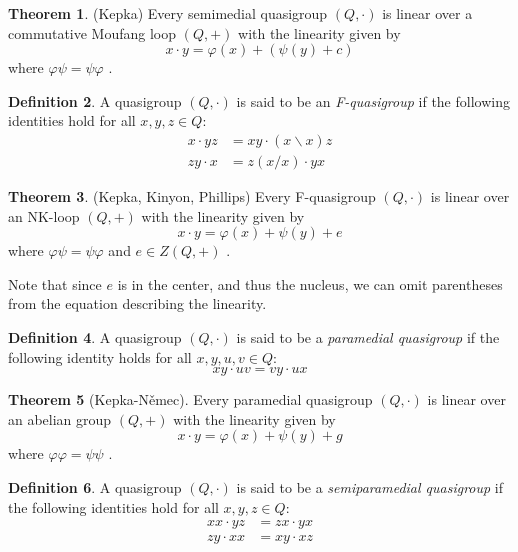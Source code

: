 \documentclass[12pt]{report}
\theoremstyle{definition}
\newtheorem{thm}{Theorem}[chapter]
\newtheorem{dfn}[thm]{Definition}
\newcommand{\ldv}{\backslash}       %
\newcommand{\rdv}{/}                %
\begin{document}
\begin{thm}(Kepka)
  Every semimedial quasigroup $(Q, \cdot)$ is linear over a commutative Moufang loop $(Q, +)$ with
    the linearity given by
  \[x\cdot y = \varphi(x) + (\psi(y) + c)\]
  where $\varphi\psi = \psi\varphi$ \cite{triabelian}.
\end{thm}

\begin{dfn}
  A quasigroup $(Q, \cdot)$ is said to be an \emph{F-quasigroup} if the following identities hold
    for all $x, y, z \in Q$:
  \begin{align*}
    x\cdot yz &= xy\cdot (x\ldv x)z\\
    zy\cdot x &= z(x\rdv x) \cdot yx
  \end{align*}
\end{dfn}

\begin{thm}(Kepka, Kinyon, Phillips)
  Every F-quasigroup $(Q, \cdot)$ is linear over an NK-loop $(Q, +)$ with the linearity given by
  \[x\cdot y = \varphi(x) + \psi(y) + e\]
  where $\varphi\psi = \psi\varphi$ and $e\in Z(Q, +)$ \cite{KepkaKinyonPhillips}.
\end{thm}

Note that since $e$ is in the center, and thus the nucleus, we can omit parentheses from the equation
  describing the linearity.

\begin{dfn}
  A quasigroup $(Q, \cdot)$ is said to be a \emph{paramedial quasigroup} if the following identity holds
    for all $x, y, u, v\in Q$:
  \[xy\cdot uv = vy\cdot ux\]
\end{dfn}

\begin{thm}[Kepka-N\v{e}mec]
  Every paramedial quasigroup $(Q, \cdot)$ is linear over an abelian group $(Q, +)$ with the linearity
    given by
  \[x\cdot y = \varphi(x) + \psi(y) + g\]
  where $\varphi\varphi = \psi\psi$ \cite{SP}.
\end{thm}

\begin{dfn}
  A quasigroup $(Q, \cdot)$ is said to be a \emph{semiparamedial quasigroup} if the following identities
    hold for all $x, y, z\in Q$:
  \begin{align*}
    xx\cdot yz &= zx\cdot yx\\
    zy\cdot xx &= xy\cdot xz
  \end{align*}
\end{dfn}
\end{document}
